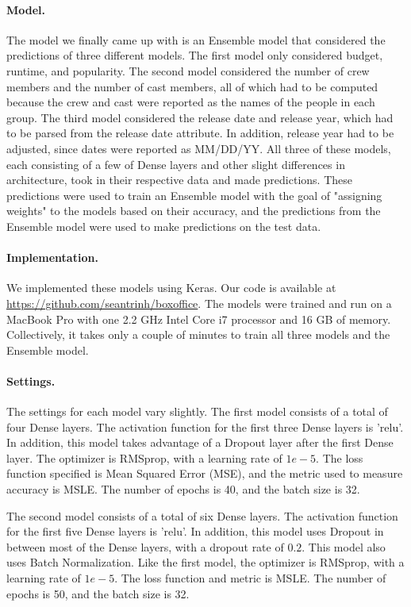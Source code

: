 \documentclass[11pt]{article}
\numberwithin{equation}{section}
\begin{document}
\paragraph{Model.}
The model we finally came up with is an Ensemble model that considered the predictions of three different models. The first model only considered budget, runtime, and popularity. The second model considered the number of crew members and the number of cast members, all of which had to be computed because the crew and cast were reported as the names of the people in each group. The third model considered the release date and release year, which had to be parsed from the release date attribute. In addition, release year had to be adjusted, since dates were reported as MM/DD/YY. All three of these models, each consisting of a few of Dense layers and other slight differences in architecture, took in their respective data and made predictions. These predictions were used to train an Ensemble model with the goal of "assigning weights" to the models based on their accuracy, and the predictions from the Ensemble model were used to make predictions on the test data. 

\paragraph{Implementation.}
We implemented these models using Keras. Our code is available at \url{https://github.com/seantrinh/boxoffice}. The models were trained and run on a MacBook Pro with one 2.2 GHz Intel Core i7 processor and 16 GB of memory. Collectively, it takes only a couple of minutes to train all three models and the Ensemble model.

\paragraph{Settings.}
The settings for each model vary slightly.
The first model consists of a total of four Dense layers. The activation function for the first three Dense layers is 'relu'. In addition, this model takes advantage of a Dropout layer after the first Dense layer. The optimizer is RMSprop, with a learning rate of $1e-5$. The loss function specified is Mean Squared Error (MSE), and the metric used to measure accuracy is MSLE. The number of epochs is 40, and the batch size is 32. 

The second model consists of a total of six Dense layers. The activation function for the first five Dense layers is 'relu'. In addition, this model uses Dropout in between most of the Dense layers, with a dropout rate of $0.2$. This model also uses Batch Normalization. Like the first model, the optimizer is RMSprop, with a learning rate of $1e-5$. The loss function and metric is MSLE. The number of epochs is 50, and the batch size is 32. 
\end{document}
